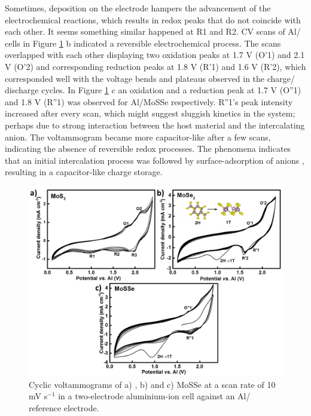 Sometimes, deposition on the electrode hampers the advancement of the electrochemical reactions, which results in redox peaks that do not coincide with each other. It seems something similar happened at R1 and R2. CV scans of Al/ cells in Figure \ref{Figures/chap4fig:fig2} b indicated a reversible electrochemical process. The scans overlapped with each other displaying two oxidation peaks at 1.7 V (O'1) and 2.1 V (O'2) and corresponding reduction peaks at 1.8 V (R'1) and 1.6 V (R'2), which corresponded well with the voltage bends and plateaus observed in the charge/ discharge cycles. In Figure \ref{Figures/chap4fig:fig2} c an oxidation and a reduction peak at 1.7 V (O''1) and 1.8 V (R''1) was observed for Al/MoSSe respectively. R''1's peak intensity increased after every scan, which might suggest sluggish kinetics in the system; perhaps due to strong interaction between the host material and the intercalating anion. The voltammogram became more capacitor-like after a few scans, indicating the absence of reversible redox processes. The phenomena indicates that an initial intercalation process was followed by surface-adsorption of  anions , resulting in a capacitor-like charge storage. 

\begin{figure}
  \centering
  \includegraphics[width=\textwidth]{Figures/chap4fig/fig2}
  \caption{Cyclic voltammograms of a) , b)  and c) MoSSe at a scan rate of 10 mV s$^{-1}$ in a two-electrode aluminium-ion cell against an Al/ reference electrode.}
  \label{Figures/chap4fig:fig2}
\end{figure} 

